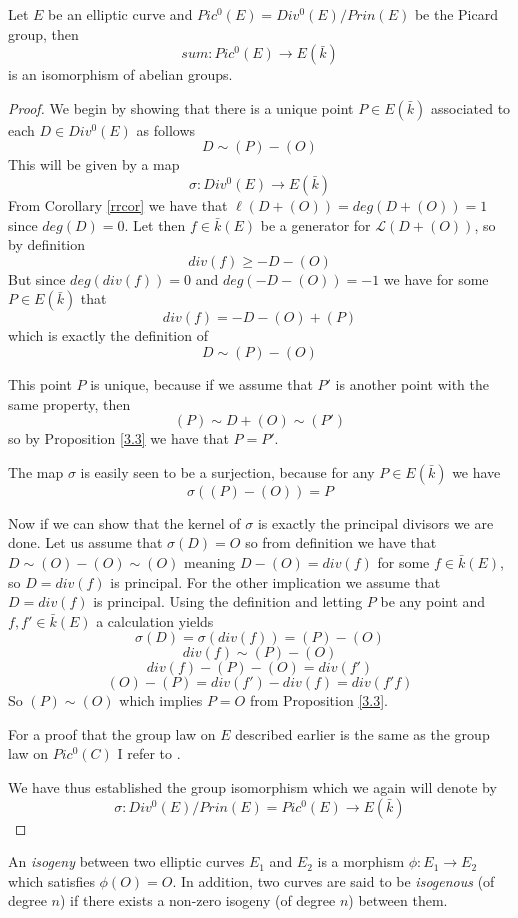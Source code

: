 \begin{thm} \label{isoteorem}
Let $E$ be an elliptic curve and $Pic^0(E) = Div^0(E)/Prin(E)$ be the Picard group, then
 $$ sum: Pic^0(E) \rightarrow E(\bar{k}) $$
is an isomorphism of abelian groups.
\end{thm}
\begin{proof}
 We begin by showing that there is a unique point $P \in E(\bar{k})$ associated to
each $D \in Div^0(E)$ as follows
$$ D \sim (P) -(O) $$
This will be given by a map
$$ \sigma: Div^0(E) \rightarrow E(\bar{k}) $$
From Corollary \ref{rrcor} we have that $\ell(D+(O)) = deg(D+(O)) = 1$ since $deg(D) = 0$.
Let then $f \in \bar{k}(E)$ be a generator for $\mathscr{L}(D+(O))$, so by definition
$$ div(f) \geq -D-(O) $$
But since $deg(div(f)) = 0$ and $deg(-D-(O)) = -1$ we have for some $P \in E(\bar{k})$ that
$$ div(f) = -D-(O)+(P) $$
which is exactly the definition of
$$ D \sim (P) - (O) $$

This point $P$ is unique, because if we assume that $P'$ is another point with the same
property, then
$$ (P) \sim D + (O) \sim (P') $$
so by Proposition \ref{3.3} we have that $ P = P'$.

The map $\sigma$ is easily seen to be a surjection, because for any $P \in E(\bar{k})$ we have
$$ \sigma((P)-(O)) = P $$

Now if we can show that the kernel of $\sigma$ is exactly the principal divisors we are done.
Let us assume that $\sigma(D) = O$ so from definition we have that $D \sim (O)-(O) \sim (O)$
meaning $D - (O) = div(f)$ for some $f \in \bar{k}(E)$, so $D = div(f)$ is principal.
For the other implication we assume that $D = div(f)$ is principal. Using the definition and
letting $P$ be any point and $f, f' \in \bar{k}(E)$ a calculation yields
$$ \sigma(D) = \sigma(div(f)) = (P)-(O) $$
$$ div(f) \sim (P) - (O) $$
$$ div(f) - (P) - (O) = div(f') $$
$$ (O) - (P) = div(f') - div(f) = div(f' f) $$
So $ (P) \sim (O) $ which implies $P = O$ from Proposition \ref{3.3}.

For a proof that the group law on $E$ described earlier is the same as the group law on $Pic^0(C)$ I refer
to \cite{AEC}.

We have thus established the group isomorphism which we again will denote by
$$ \sigma : Div^0(E)/Prin(E) = Pic^0(E) \rightarrow E(\bar{k}) $$

\end{proof}

\begin{mydef}
 An \emph{isogeny} between two elliptic curves $E_1$ and $E_2$ is a morphism $\phi: E_1 \rightarrow E_2$
which satisfies $\phi(O) = O$. In addition, two curves are said to be \emph{isogenous} (of degree $n$) 
if there exists a non-zero isogeny (of degree $n$) between them.
\end{mydef}

